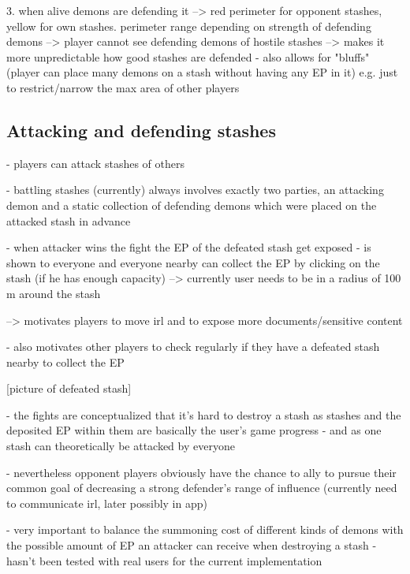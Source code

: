 3. when alive demons are defending it --> red perimeter for opponent stashes, yellow for own stashes. perimeter range depending on strength of defending demons
--> player cannot see defending demons of hostile stashes --> makes it more unpredictable how good stashes are defended
- also allows for "bluffs" (player can place many demons on a stash without having any EP in it) e.g. just to restrict/narrow the max area of other players


\subsection{Attacking and defending stashes}
\label{subsec:attackingstashes}

- players can attack stashes of others

- battling stashes (currently) always involves exactly two parties, an attacking demon and a static collection of defending demons which were placed on the attacked stash in advance

- when attacker wins the fight the EP of the defeated stash get exposed 
- is shown to everyone and everyone nearby can collect the EP by clicking on the stash (if he has enough capacity) --> currently user needs to be in a radius of 100 m around the stash 

--> motivates players to move irl and to expose more documents/sensitive content

- also motivates other players to check regularly if they have a defeated stash nearby to collect the EP

[picture of defeated stash]

- the fights are conceptualized that it's hard to destroy a stash as stashes and the deposited EP within them are basically the user's game progress
- and as one stash can theoretically be attacked by everyone

- nevertheless opponent players obviously have the chance to ally to pursue their common goal of decreasing a strong defender's range of influence (currently need to communicate irl, later possibly in app)

- very important to balance the summoning cost of different kinds of demons with the possible amount of EP an attacker can receive when destroying a stash
- hasn't been tested with real users for the current implementation

